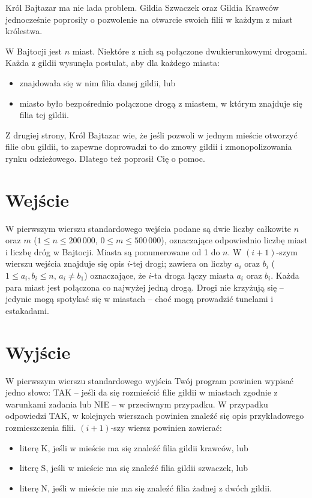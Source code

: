 \documentclass{spiral-kurs}
\begin{document}
\makeheader

Król Bajtazar ma nie lada problem. Gildia Szwaczek oraz Gildia Krawców jednocześnie poprosiły o pozwolenie na otwarcie swoich filii w każdym z miast królestwa.

W Bajtocji jest $n$ miast. Niektóre z nich są połączone dwukierunkowymi drogami. Każda z gildii wysunęła postulat, aby dla każdego miasta:

\begin{itemize}
  \item znajdowała się w nim filia danej gildii, lub
  \item miasto było bezpośrednio połączone drogą z miastem, w którym znajduje się filia tej gildii.
\end{itemize}

Z drugiej strony, Król Bajtazar wie, że jeśli pozwoli w jednym mieście otworzyć filie obu gildii, to zapewne doprowadzi to do zmowy gildii i zmonopolizowania rynku odzieżowego. Dlatego też poprosił Cię o pomoc.

\section{Wejście}
W pierwszym wierszu standardowego wejścia podane są dwie liczby całkowite $n$ oraz $m$ ($1 \le n \le 200\,000$, $0 \le m \le 500\,000$), oznaczające odpowiednio liczbę miast i liczbę dróg w Bajtocji. Miasta są ponumerowane od 1 do $n$. W $(i+1)$-szym wierszu wejścia znajduje się opis $i$-tej drogi; zawiera on liczby $a_i$ oraz $b_i$ ($1 \le a_i, b_i \le n$, $a_i \neq b_1$) oznaczające, że $i$-ta droga łączy miasta $a_i$ oraz $b_i$. Każda para miast jest połączona co najwyżej jedną drogą. Drogi nie krzyżują się -- jedynie mogą spotykać się w miastach -- choć mogą prowadzić tunelami i estakadami.

\section{Wyjście}
W pierwszym wierszu standardowego wyjścia Twój program powinien wypisać jedno słowo: TAK -- jeśli da się rozmieścić filie gildii w miastach zgodnie z warunkami zadania lub NIE -- w przeciwnym przypadku. W przypadku odpowiedzi TAK, w kolejnych wierszach powinien znaleźć się opis przykładowego rozmieszczenia filii. $(i+1)$-szy wiersz powinien zawierać:

\begin{itemize}
  \item literę K, jeśli w mieście ma się znaleźć filia gildii krawców, lub
  \item literę S, jeśli w mieście ma się znaleźć filia gildii szwaczek, lub
  \item literę N, jeśli w mieście nie ma się znaleźć filia żadnej z dwóch gildii.
\end{itemize}


\end{document}
